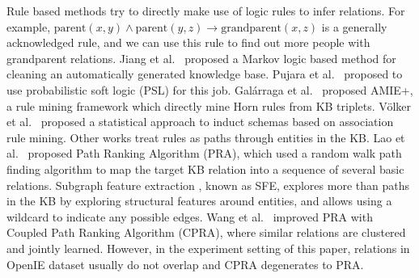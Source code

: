 
Rule based methods try to directly make use of logic rules to infer relations. For example, $\text{parent}(x, y) \land \text{parent}(y, z) \rightarrow \text{grandparent}(x, z)$ is a generally acknowledged rule, and we can use this rule to find out more people with grandparent relations. Jiang et al.~ proposed a Markov logic based method for cleaning an automatically generated knowledge base. Pujara et al.~ proposed to use probabilistic soft logic (PSL) for this job. Gal\'arraga et al.~ proposed AMIE+, a rule mining framework which directly mine Horn rules from KB triplets. V\"olker et al.~ proposed a statistical approach to induct schemas based on association rule mining.
Other works treat rules as paths through entities in the KB.
Lao et al.~ proposed Path Ranking Algorithm (PRA),
which used a random walk path finding algorithm to map the target KB relation into a sequence of several basic relations.
Subgraph feature extraction , known as SFE, explores more than paths in the KB 
by exploring structural features around entities, and allows using a wildcard to indicate any possible edges.
Wang et al.~ improved PRA with Coupled Path Ranking Algorithm (CPRA),
where similar relations are clustered and jointly learned.
However, in the experiment setting of this paper, relations in OpenIE dataset usually do not overlap and CPRA degenerates to PRA.

